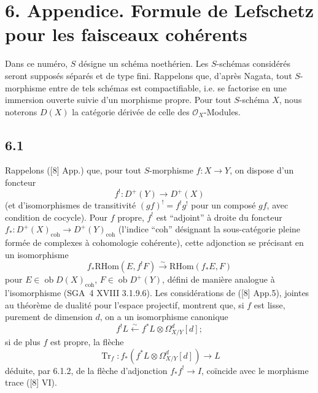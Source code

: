 \documentclass[11pt]{article}
\providecommand{\cO}{\mathcal{O}}
\providecommand{\RHom}{\mathrm{RHom}}
\providecommand{\RHom}{\mathrm{RHom}}
\providecommand{\RHom}{\mathrm R\mathcal{H}om}
\begin{document}
\section*{6. Appendice. Formule de Lefschetz pour les faisceaux cohérents}

Dans ce numéro, $S$ désigne un schéma noethérien. Les $S$-schémas considérés seront supposés séparés et de type fini. Rappelons que, d'après Nagata, tout $S$-morphisme entre de tels schémas est compactifiable, i.e. se factorise en une immersion ouverte suivie d'un morphisme propre. Pour tout $S$-schéma $X$, nous noterons $D(X)$ la catégorie dérivée de celle des $\cO_X$-Modules.

\subsection*{6.1}
Rappelons ([8] App.) que, pour tout $S$-morphisme $f:X\to Y$, on dispose d'un foncteur
\[
f^!:D^+(Y)\longrightarrow D^+(X)
\]
(et d'isomorphismes de transitivité $(gf)^! = f^!g^!$ pour un composé $gf$, avec condition de cocycle). Pour $f$ propre, $f^!$ est ``adjoint'' à droite du foncteur $f_*:D^+(X)_{\mathrm{coh}}\to D^+(Y)_{\mathrm{coh}}$ (l'indice ``coh'' désignant la sous-catégorie pleine formée de complexes à cohomologie cohérente), cette adjonction se précisant en un isomorphisme
\begin{equation}
\tag{6.1.1}
f_*\RHom(E,f^!F)\xrightarrow{\sim}\RHom(f_*E,F)
\end{equation}
pour $E\in\operatorname{ob}D(X)_{\mathrm{coh}}$, $F\in\operatorname{ob}D^+(Y)$, défini de manière analogue à l'isomorphisme (SGA~4 XVIII 3.1.9.6). Les considérations de ([8] App.5), jointes au théorème de dualité pour l'espace projectif, montrent que, si $f$ est lisse, purement de dimension $d$, on a un isomorphisme canonique
\begin{equation}
\tag{6.1.2}
f^!L\xleftarrow{\sim} f^*L\otimes\Omega^d_{X/Y}[d];
\end{equation}
si de plus $f$ est propre, la flèche
\begin{equation}
\tag{6.1.3}
\operatorname{Tr}_f:f_*(f^*L\otimes\Omega^d_{X/Y}[d])\longrightarrow L
\end{equation}
déduite, par 6.1.2, de la flèche d'adjonction $f_*f^!\to I$, coïncide avec le morphisme trace ([8] VI).
\end{document}
